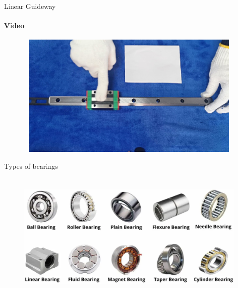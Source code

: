 \documentclass[aspectratio=169]{beamer}
\begin{document}
\begin{frame}[t]{Linear Guideway}
    \framesubtitle{Video}
    \vspace{-0.6cm}
    \begin{figure}[H]
        \href{https://youtu.be/Ezooa2dIyRA}{
            \centering\includegraphics[height=6cm,width=1\textwidth,keepaspectratio]{linearguideway_video.jpg}}
        \label{fig:linearguideway_video.jpg}
    \end{figure}
\end{frame}

\begin{frame}[t]{Types of bearings}
\framesubtitle{}
    \vspace{-0.6cm}
    \begin{figure}[H]
        \centering\includegraphics[height=6cm,width=1\textwidth,keepaspectratio]{bearing_types.png}
        \label{fig:bearing_types.png}
    \end{figure}
\end{frame}
\end{document}
